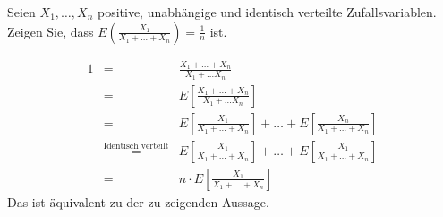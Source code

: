 \begin{Exercise}
	Seien $X_1,\dots,X_n$ positive, unabhängige und identisch verteilte Zufallsvariablen. Zeigen Sie, dass $E(\frac{X_1}{X_1+\dots+X_n})=\frac{1}{n}$ ist.
\end{Exercise}

\begin{Answer}
	\begin{eqnarray*}
		1&=&\frac{X_1+\dots+ X_n}{X_1+\dots X_n}\\
		&=&E\left[\frac{X_1+\dots+ X_n}{X_1+\dots X_n}\right]\\
		&=&E\left[\frac{X_1}{X_1+\dots+X_n}\right]+\dots+E\left[\frac{X_n}{X_1+\dots+X_n}\right]\\
		&\stackrel{\text{Identisch verteilt}}{=}&E\left[\frac{X_1}{X_1+\dots+X_n}\right]+\dots+E\left[\frac{X_1}{X_1+\dots+X_n}\right]\\
		&=&n\cdot E\left[\frac{X_1}{X_1+\dots+X_n}\right]
	\end{eqnarray*}
	Das ist äquivalent zu der zu zeigenden Aussage.
\end{Answer}

